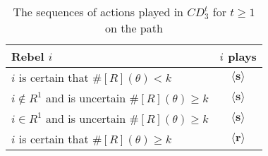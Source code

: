 \documentclass[12pt,letter]{article}
\theoremstyle{definition}
\theoremstyle{remark}
\theoremstyle{claim}
\begin{document}
\begin{table}[!htbp]
\caption{The sequences of actions played in $CD^t_{3}$ for $t\geq 1$ on the path}
\label{Table_cdt3v}
\begin{center}
\begin{tabular}{l c}
Rebel $i$ 	 	&  	$i$ plays		 \\
\hline
\hline
$i$ is certain that $\#[R](\theta)<k$ 	& 	$\langle \textbf{s} \rangle$	\\
$i\notin R^{1}$ and is uncertain $\#[R](\theta)\geq k$	& 	$\langle \textbf{s} \rangle$	\\
$i\in R^{1}$ and is uncertain $\#[R](\theta)\geq k$ &  $\langle \textbf{s} \rangle$  \\
$i$ is certain that $\#[R](\theta)\geq k$ &  $\langle \textbf{r} \rangle$  \\
\hline
\end{tabular}
\end{center}
\end{table}
\clearpage




%
%
\end{document}
